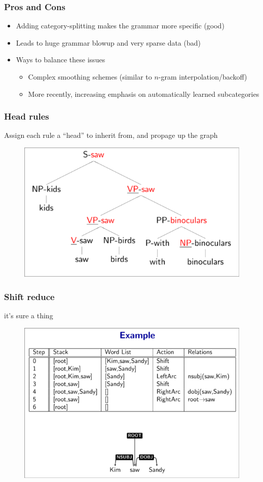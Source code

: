 \documentclass[landscape, 8pt]{extarticle}
\begin{document}
\begin{multicols}{3}
\subsubsection{Pros and Cons}
\begin{itemize}
    \setlength\itemsep{0em}
    \item Adding category-splitting makes the grammar more specific (good)
    \item Leads to huge grammar blowup and very sparse data (bad)
    \item Ways to balance these issues
        \begin{itemize}
            \setlength\itemsep{0em}
            \item Complex smoothing schemes (similar to $n$-gram interpolation/backoff)
            \item More recently, increasing emphasis on automatically learned subcategories
        \end{itemize}
\end{itemize}


\subsubsection{Head rules}

Assign each rule a ``head'' to inherit from, and propage up the graph

\begin{figure}[H]
    \centering
    \includegraphics[width=0.5\linewidth]{images/2024-05-10-191207_hyprshot.png}
\end{figure}


\subsubsection{Shift reduce}
it's sure a thing
\begin{figure}[H]
    \centering
    \includegraphics[width=0.5\linewidth]{images/2024-05-10-191702_hyprshot.png}
\end{figure}


\end{multicols}
\end{document}
